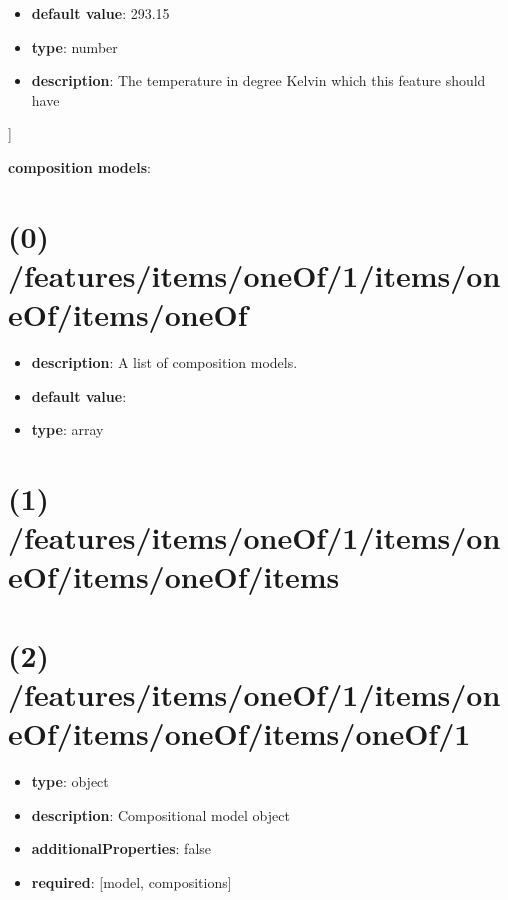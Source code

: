 \begin{itemize}[leftmargin=1em]\item {\bf default value}: 293.15
\item {\bf type}: number
\item {\bf description}: The temperature in degree Kelvin which this feature should have
\end{itemize}]\item {\bf composition models}: \section{(0) /features/items/oneOf/1/items/oneOf/items/oneOf}
\begin{itemize}[leftmargin=0em]\item {\bf description}: A list of composition models.
\item {\bf default value}: 
\item {\bf type}: array
\end{itemize}\section{(1) /features/items/oneOf/1/items/oneOf/items/oneOf/items}

\section{(2) /features/items/oneOf/1/items/oneOf/items/oneOf/items/oneOf/1}
\begin{itemize}[leftmargin=2em]\item {\bf type}: object
\item {\bf description}: Compositional model object
\item {\bf additionalProperties}: false
\item {\bf required}: [model, compositions]\end{itemize}
